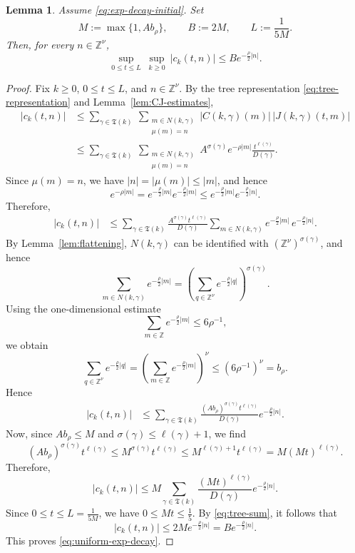 \documentclass[12pt,reqno,tbtags]{amsart}
\newtheorem{lemma}{Lemma}[section]
\newcommand\1{\mathbbm{1}}
\begin{document}
\begin{lemma}\label{lem:uniform-exp-decay}
Assume \eqref{eq:exp-decay-initial}. Set
\begin{equation}\label{eq:M-B-L}
M:=\max\{1,Ab_{\rho}\},
\qquad
B:=2M,
\qquad
L:=\frac{1}{5M}.
\end{equation}
Then, for every $n\in \mathbb{Z}^{\nu}$,
\begin{equation}\label{eq:uniform-exp-decay}
\sup_{0\leq t\leq L}\ \sup_{k\geq 0}\ |c_k(t,n)|
\leq
B e^{-\frac{\rho}{2}|n|}.
\end{equation}
\end{lemma}

\begin{proof}
Fix $k\geq 0$, $0\leq t\leq L$, and $n\in \mathbb{Z}^{\nu}$. By the tree representation
\eqref{eq:tree-representation} and Lemma~\ref{lem:CJ-estimates},
\begin{align*}
|c_k(t,n)|
&\leq
\sum_{\gamma\in \mathfrak{T}(k)}
\ \sum_{\substack{m\in N(k,\gamma)\\ \mu(m)=n}}
|C(k,\gamma)(m)|\,|J(k,\gamma)(t,m)| \\
&\leq
\sum_{\gamma\in \mathfrak{T}(k)}
\ \sum_{\substack{m\in N(k,\gamma)\\ \mu(m)=n}}
A^{\sigma(\gamma)} e^{-\rho |m|}
\frac{t^{\ell(\gamma)}}{D(\gamma)} .
\end{align*}
Since $\mu(m)=n$, we have $|n|=|\mu(m)|\leq |m|$, and hence
\[
e^{-\rho |m|}
=
e^{-\frac{\rho}{2}|m|}e^{-\frac{\rho}{2}|m|}
\leq
e^{-\frac{\rho}{2}|m|}e^{-\frac{\rho}{2}|n|}.
\]
Therefore,
\begin{align*}
|c_k(t,n)|
&\leq
\sum_{\gamma\in \mathfrak{T}(k)}
\frac{A^{\sigma(\gamma)} t^{\ell(\gamma)}}{D(\gamma)}
\sum_{m\in N(k,\gamma)}
e^{-\frac{\rho}{2}|m|}\,e^{-\frac{\rho}{2}|n|}.
\end{align*}
By Lemma~\ref{lem:flattening}, $N(k,\gamma)$ can be identified with
$(\mathbb{Z}^{\nu})^{\sigma(\gamma)}$, and hence
\[
\sum_{m\in N(k,\gamma)} e^{-\frac{\rho}{2}|m|}
=
\left(
\sum_{q\in \mathbb{Z}^{\nu}} e^{-\frac{\rho}{2}|q|}
\right)^{\sigma(\gamma)}.
\]
Using the one-dimensional estimate
\[
\sum_{m\in \mathbb{Z}} e^{-\frac{\rho}{2}|m|}\leq 6\rho^{-1},
\]
we obtain
\[
\sum_{q\in \mathbb{Z}^{\nu}} e^{-\frac{\rho}{2}|q|}
=
\left(\sum_{m\in \mathbb{Z}} e^{-\frac{\rho}{2}|m|}\right)^{\nu}
\leq
(6\rho^{-1})^{\nu}
=
b_{\rho}.
\]
Hence
\begin{align*}
|c_k(t,n)|
&\leq
\sum_{\gamma\in \mathfrak{T}(k)}
\frac{(Ab_{\rho})^{\sigma(\gamma)} t^{\ell(\gamma)}}{D(\gamma)}
e^{-\frac{\rho}{2}|n|}.
\end{align*}
Now, since $Ab_{\rho}\leq M$ and $\sigma(\gamma)\leq \ell(\gamma)+1$, we find
\[
(Ab_{\rho})^{\sigma(\gamma)} t^{\ell(\gamma)}
\leq
M^{\sigma(\gamma)} t^{\ell(\gamma)}
\leq
M^{\ell(\gamma)+1} t^{\ell(\gamma)}
=
M(Mt)^{\ell(\gamma)}.
\]
Therefore,
\[
|c_k(t,n)|
\leq
M
\sum_{\gamma\in \mathfrak{T}(k)}
\frac{(Mt)^{\ell(\gamma)}}{D(\gamma)}
e^{-\frac{\rho}{2}|n|}.
\]
Since $0\leq t\leq L=\frac{1}{5M}$, we have $0\leq Mt\leq \frac15$. By
\eqref{eq:tree-sum}, it follows that
\[
|c_k(t,n)|
\leq
2M e^{-\frac{\rho}{2}|n|}
=
B e^{-\frac{\rho}{2}|n|}.
\]
This proves \eqref{eq:uniform-exp-decay}.
\end{proof}
\end{document}
